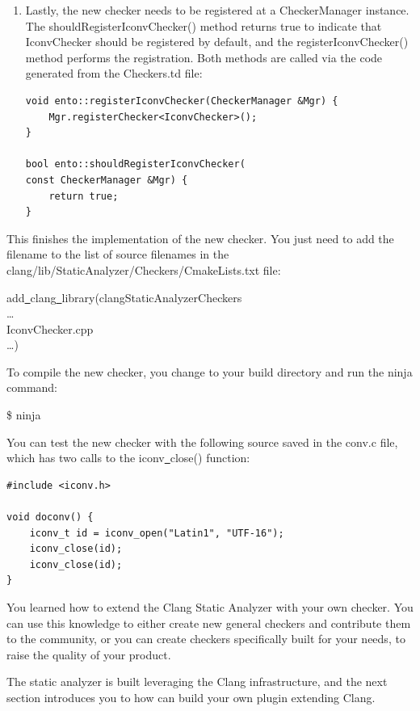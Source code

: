 \begin{enumerate}
\item Lastly, the new checker needs to be registered at a CheckerManager
instance. The shouldRegisterIconvChecker() method returns true to indicate that IconvChecker should be registered by default, and the registerIconvChecker() method performs the registration. Both methods are called via the code generated from the Checkers.td file:
\begin{lstlisting}[caption={}]
void ento::registerIconvChecker(CheckerManager &Mgr) {
	Mgr.registerChecker<IconvChecker>();
}

bool ento::shouldRegisterIconvChecker(
const CheckerManager &Mgr) {
	return true;
}
\end{lstlisting}

\end{enumerate}

This finishes the implementation of the new checker. You just need to add the filename to the list of source filenames in the clang/lib/StaticAnalyzer/Checkers/CmakeLists.txt file:\par

\begin{tcolorbox}[colback=white,colframe=black]
add\underline{~}clang\underline{~}library(clangStaticAnalyzerCheckers \\
… \\
\hspace*{0.5cm}IconvChecker.cpp \\
…)
\end{tcolorbox}

To compile the new checker, you change to your build directory and run the ninja command:\par

\begin{tcolorbox}[colback=white,colframe=black]
\$ ninja
\end{tcolorbox}

You can test the new checker with the following source saved in the conv.c file, which has two calls to the iconv\underline{~}close() function:\par

\begin{lstlisting}[caption={}]
#include <iconv.h>

void doconv() {
	iconv_t id = iconv_open("Latin1", "UTF-16");
	iconv_close(id);
	iconv_close(id);
}
\end{lstlisting}

You learned how to extend the Clang Static Analyzer with your own checker. You can use this knowledge to either create new general checkers and contribute them to the community, or you can create checkers specifically built for your needs, to raise the quality of your product. \par

The static analyzer is built leveraging the Clang infrastructure, and the next section introduces you to how can build your own plugin extending Clang.\par















